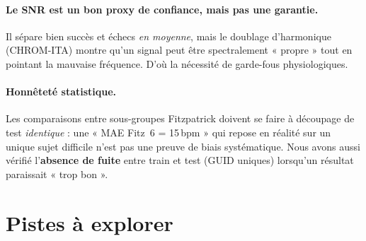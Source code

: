 \documentclass[11pt,a4paper]{article}
\begin{document}
\paragraph{Le SNR est un bon proxy de confiance, mais pas une garantie.} Il
sépare bien succès et échecs \emph{en moyenne}, mais le doublage d'harmonique
(CHROM-ITA) montre qu'un signal peut être spectralement « propre » tout en
pointant la mauvaise fréquence. D'où la nécessité de garde-fous physiologiques.

\paragraph{Honnêteté statistique.} Les comparaisons entre sous-groupes
Fitzpatrick doivent se faire à découpage de test \emph{identique} : une « MAE
Fitz~6 = 15\,bpm » qui repose en réalité sur un unique sujet difficile n'est pas
une preuve de biais systématique. Nous avons aussi vérifié l'\textbf{absence de
fuite} entre train et test (GUID uniques) lorsqu'un résultat paraissait « trop
bon ».

\section{Pistes à explorer}
\label{sec:pistes}
\end{document}
